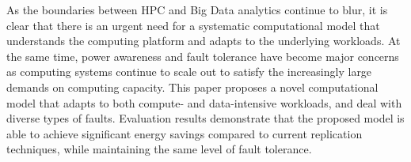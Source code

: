 As the boundaries between HPC and Big Data analytics continue to blur, it is clear that there is an urgent need for a systematic computational model that understands the computing platform and adapts to the underlying workloads. At the same time, power awareness and fault tolerance have become major concerns as computing systems continue to scale out to satisfy the increasingly large demands on computing capacity. This paper proposes a novel computational model that adapts to both compute- and data-intensive workloads, and deal with diverse types of faults. Evaluation results demonstrate that the proposed model is able to achieve significant energy savings compared to current replication techniques, while maintaining the same level of fault tolerance.